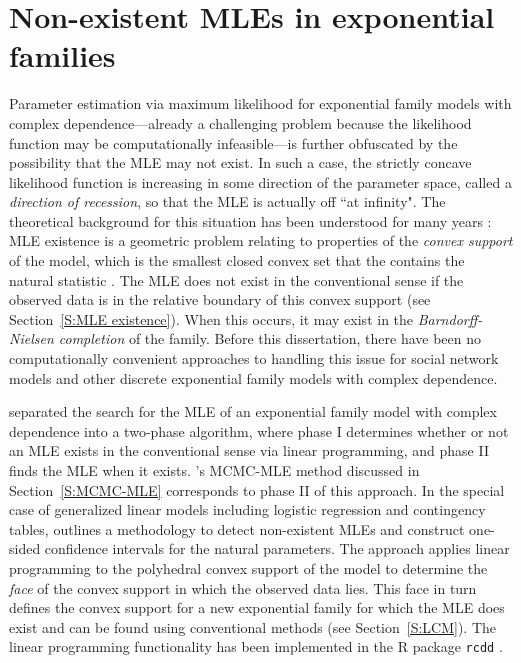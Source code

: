 \section{Non-existent MLEs in exponential families} \label{S:Non-existent MLE}
Parameter estimation via maximum likelihood for exponential family models with 
complex dependence---already a 
challenging problem because the likelihood function may be computationally 
infeasible---is further obfuscated by the possibility that the MLE
may not exist.  
In such a case, the strictly concave likelihood function is
increasing in some direction of the parameter space, called a 
\emph{direction of recession}, so that the MLE is actually off ``at infinity".
The theoretical background 
for this situation has been understood for many years 
\citep{Barndorff,Brown:1986}: MLE existence is a
geometric problem relating to properties of the \emph{convex support} of the model,
which is  the smallest closed convex set 
that the contains the natural statistic \citep{Geyer:gdor}.  
The MLE does not exist in the conventional sense if the 
observed data is in the relative boundary of this 
convex support (see Section~\ref{S:MLE existence}).
When this occurs, 
it may exist in the \emph{Barndorff-Nielsen completion} of the family.
Before this dissertation, there have been no 
computationally convenient approaches to handling this issue for social network models
and other discrete exponential family models with complex dependence.

\citet{Geyer:1992} separated the search for the MLE of an exponential family model
with complex dependence into a two-phase algorithm, 
where phase I determines whether or not an MLE exists in the conventional 
sense via linear programming, and phase II finds the MLE when it exists.
\citeauthor{Geyer:1992}'s MCMC-MLE method discussed in Section~\ref{S:MCMC-MLE} corresponds to phase II of
this approach.
In the special case of generalized linear models including logistic regression and contingency 
tables, \citet{Geyer:gdor} outlines a methodology to detect non-existent MLEs and construct 
one-sided confidence intervals for the natural parameters.
The approach applies linear programming to the polyhedral convex support of 
the model to determine the \emph{face} of the convex support 
in which the observed data lies.  
This face in turn defines the convex support for a new exponential family for which the MLE 
does exist and can be found using conventional methods (see Section~\ref{S:LCM}).
The linear programming 
functionality has been implemented in the R package \texttt{rcdd} \citep*{rcdd:R}.

